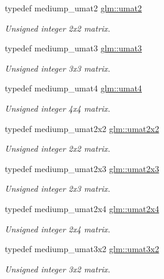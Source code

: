 \begin{DoxyCompactItemize}
typedef mediump\-\_\-umat2 \hyperlink{group__gtc__matrix__integer_gae2d45c058cfa0b60ab4df0cdda2d8516}{glm\-::umat2}
\begin{DoxyCompactList}\small\item\em Unsigned integer 2x2 matrix. \end{DoxyCompactList}\item 
typedef mediump\-\_\-umat3 \hyperlink{group__gtc__matrix__integer_ga8b8fbc858e28abf8fc344744f8d6d368}{glm\-::umat3}
\begin{DoxyCompactList}\small\item\em Unsigned integer 3x3 matrix. \end{DoxyCompactList}\item 
typedef mediump\-\_\-umat4 \hyperlink{group__gtc__matrix__integer_ga7ae562000d8a8d193e9f93cf51e2e113}{glm\-::umat4}
\begin{DoxyCompactList}\small\item\em Unsigned integer 4x4 matrix. \end{DoxyCompactList}\item 
typedef mediump\-\_\-umat2x2 \hyperlink{group__gtc__matrix__integer_gad3c997b31dd69bdb4787867e758ed48d}{glm\-::umat2x2}
\begin{DoxyCompactList}\small\item\em Unsigned integer 2x2 matrix. \end{DoxyCompactList}\item 
typedef mediump\-\_\-umat2x3 \hyperlink{group__gtc__matrix__integer_ga890ae28f9230794138b2c89f44ce3376}{glm\-::umat2x3}
\begin{DoxyCompactList}\small\item\em Unsigned integer 2x3 matrix. \end{DoxyCompactList}\item 
typedef mediump\-\_\-umat2x4 \hyperlink{group__gtc__matrix__integer_ga3b23b164240cf4dfb429776da7be9d88}{glm\-::umat2x4}
\begin{DoxyCompactList}\small\item\em Unsigned integer 2x4 matrix. \end{DoxyCompactList}\item 
typedef mediump\-\_\-umat3x2 \hyperlink{group__gtc__matrix__integer_ga257300f2710612877ef45438a366e308}{glm\-::umat3x2}
\begin{DoxyCompactList}\small\item\em Unsigned integer 3x2 matrix. \end{DoxyCompactList}\item 

\end{DoxyCompactItemize}
